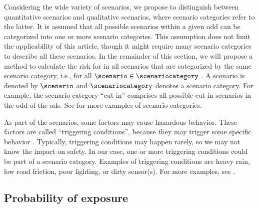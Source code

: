 Considering the wide variety of scenarios, we propose to distinguish between quantitative scenarios and qualitative scenarios, where scenario categories refer to the latter.
It is assumed that all possible scenarios within a given \ac{odd} can be categorized into one or more scenario categories. 
This assumption does not limit the applicability of this article, though it might require many scenario categories to describe all these scenarios.
In the remainder of this section, we will propose a method to calculate the risk for  in all scenarios that are categorized by the same scenario category, i.e., for all $\scenario \in \scenariocategory$ \autocite{degelder2021ontology}.
A scenario is denoted by $\scenario$ and $\scenariocategory$ denotes a scenario category.
For example, the scenario category ``cut-in'' comprises all possible cut-in scenarios in the \ac{odd} of the \ac{ads}.
See \autocite{degelder2019scenariocategories} for more examples of scenario categories.


\begin{remark}
	As part of the scenarios, some factors may cause hazardous behavior. 
	These factors are called ``triggering conditions'', because they may trigger some specific behavior \autocite{ISO21448}.
	Typically, triggering conditions may happen rarely, so we may not know the impact on safety. 
	In our case, one or more triggering conditions could be part of a scenario category.
	Examples of triggering conditions are heavy rain, low road friction, poor lighting, or dirty sensor(s). 
	For more examples, see \autocite{ISO21448}.
\end{remark}



\subsection{Probability of exposure}
\label{sec:exposure}

